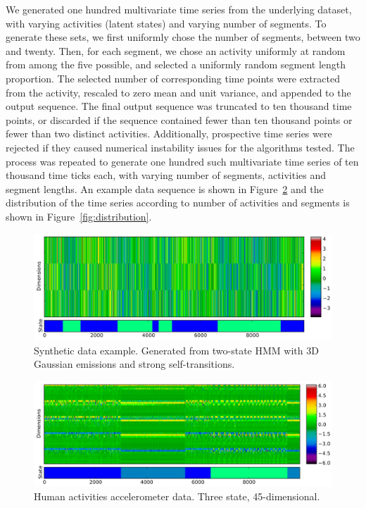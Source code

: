 \documentclass[letterpaper]{article}
\begin{document}
We generated one hundred multivariate time series from the underlying dataset,
with varying activities (latent states) and varying number of segments. To generate
these sets, we first uniformly chose the number of
segments, between two and twenty. Then, for each segment, we chose an activity
uniformly at random from among the five possible, and selected a uniformly
random segment length proportion. The selected number of corresponding time
points were extracted from the activity, rescaled to zero mean and unit
variance, and appended to the output sequence. The final output sequence was
truncated to ten thousand time points, or discarded if the sequence contained
fewer than ten thousand points or fewer than two distinct activities.
Additionally, prospective time series were rejected if they caused
numerical instability issues for the algorithms tested. The process was repeated to generate one hundred
such multivariate time series of ten thousand time ticks each, with varying number of segments,
activities and segment lengths. An example data sequence is shown in Figure~\ref{fig:accelerometer} and the
distribution of the time series according to number of activities and segments
is shown in Figure~\ref{fig:distribution}.
\begin{figure}[htbp]
\setlength{\abovecaptionskip}{0pt}
\setlength{\belowcaptionskip}{0cm}
\setlength{\floatsep}{0cm}
\centering
    \includegraphics[width=1.\linewidth]{images/3D_synthetic_data_example.pdf}    
  \caption{\small{Synthetic data example. Generated from two-state HMM with 3D
  Gaussian emissions and strong self-transitions.}}
  \label{fig:simulated}
\end{figure}
\begin{figure}[htbp]  
\setlength{\abovecaptionskip}{0pt}
\setlength{\belowcaptionskip}{0cm}
\setlength{\floatsep}{0cm}
\centering
    \includegraphics[width=1.\linewidth]{images/accelerometer-data.pdf}
  \caption{\small{Human activities accelerometer data. Three state,
  45-dimensional.}}
    \label{fig:accelerometer}
\end{figure}
\end{document}
